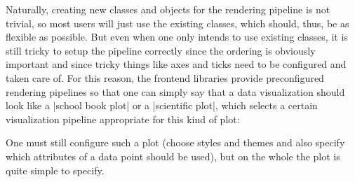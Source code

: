 Naturally, creating new classes and objects for the rendering pipeline
is not trivial, so most users will just use the existing classes,
which should, thus, be as flexible as possible. But even when one only
intends to use existing classes, it is still tricky to setup the
pipeline correctly since the ordering is obviously important and since
tricky things like axes and ticks need to be configured and taken care
of. For this reason, the frontend libraries provide
preconfigured rendering pipelines so that one can simply say that a
data visualization should look like a |school book plot| or a
|scientific plot|, which selects a certain visualization pipeline
appropriate for this kind of plot:
\begin{codeexample}[]
\end{codeexample}
\begin{codeexample}[]
\end{codeexample}
One must still configure such a plot (choose styles and themes
and also specify which attributes of a data point should be used), but
on the whole the plot is quite simple to specify.



